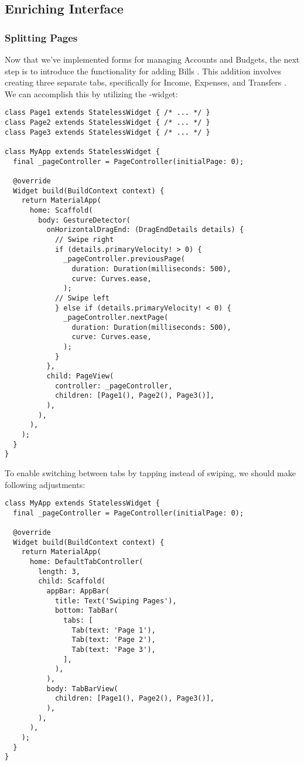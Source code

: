 
\subsection{Enriching Interface}

\subsubsection{Splitting Pages}

Now that we've implemented forms for managing Accounts and Budgets, the next step is to introduce the functionality 
for adding Bills . This addition involves creating three separate tabs, specifically for Income, Expenses, 
and Transfers . We can accomplish this by utilizing the -widget:

\begin{lstlisting}
class Page1 extends StatelessWidget { /* ... */ }
class Page2 extends StatelessWidget { /* ... */ }
class Page3 extends StatelessWidget { /* ... */ }

class MyApp extends StatelessWidget {
  final _pageController = PageController(initialPage: 0);

  @override
  Widget build(BuildContext context) {
    return MaterialApp(
      home: Scaffold(
        body: GestureDetector(
          onHorizontalDragEnd: (DragEndDetails details) {
            // Swipe right
            if (details.primaryVelocity! > 0) { 
              _pageController.previousPage(
                duration: Duration(milliseconds: 500),
                curve: Curves.ease,
              );
            // Swipe left
            } else if (details.primaryVelocity! < 0) { 
              _pageController.nextPage(
                duration: Duration(milliseconds: 500),
                curve: Curves.ease,
              );
            }
          },
          child: PageView(
            controller: _pageController,
            children: [Page1(), Page2(), Page3()],
          ),
        ),
      ),
    );
  }
}
\end{lstlisting}

\noindent To enable switching between tabs by tapping instead of swiping, we should make following adjustments:

\begin{lstlisting}
class MyApp extends StatelessWidget {
  final _pageController = PageController(initialPage: 0);

  @override
  Widget build(BuildContext context) {
    return MaterialApp(
      home: DefaultTabController(
        length: 3,
        child: Scaffold(
          appBar: AppBar(
            title: Text('Swiping Pages'),
            bottom: TabBar(
              tabs: [
                Tab(text: 'Page 1'),
                Tab(text: 'Page 2'),
                Tab(text: 'Page 3'),
              ],
            ),
          ),
          body: TabBarView(
            children: [Page1(), Page2(), Page3()],
          ),
        ),
      ),
    );
  }
}
\end{lstlisting}

